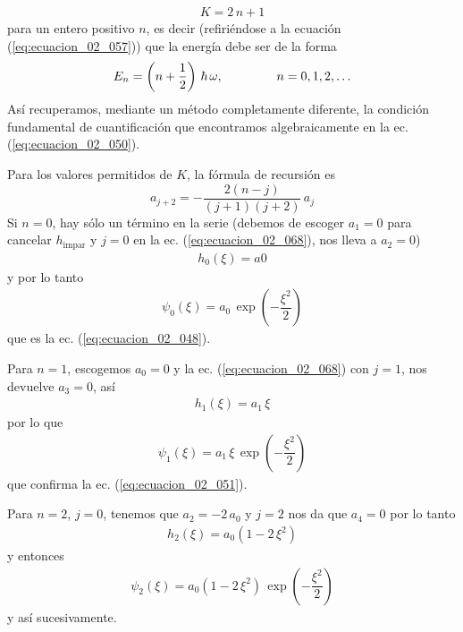 \begin{align*}
K = 2 \, n + 1
\end{align*}
para un entero positivo $n$, es decir (refiriéndose a la ecuación (\ref{eq:ecuacion_02_057})) que la energía debe ser de la forma
\begin{equation}
E_{n} = \left( n + \dfrac{1}{2} \right) \, \hbar \, \omega , \hspace{1.5cm} n = 0, 1, 2, \ldots
\label{eq:ecuacion_02_067}
\end{equation}
Así recuperamos, mediante un método completamente diferente, la condición fundamental de cuantificación que encontramos algebraicamente en la ec. (\ref{eq:ecuacion_02_050}).
\par
Para los valores permitidos de $K$, la fórmula de recursión es
\begin{equation}
a_{j+2} = - \dfrac{2 (n - j)}{(j + 1)(j + 2)} \, a_{j}
\label{eq:ecuacion_02_068}
\end{equation}
Si $n = 0$, hay sólo un término en la serie (debemos de escoger $a_{1} = 0$ para cancelar $h_{\text{impar}}$ y $j=0$ en la ec. (\ref{eq:ecuacion_02_068}), nos lleva a $a_{2}=0$)
\begin{align*}
h_{0} (\xi) = a{0}
\end{align*}
y por lo tanto
\begin{align*}
\psi_{0} (\xi) = a_{0} \, \exp \left( - \dfrac{\xi^{2}}{2} \right)
\end{align*}
que es la ec. (\ref{eq:ecuacion_02_048}).
\par
Para $n=1$, escogemos $a_{0} = 0$ y la ec. (\ref{eq:ecuacion_02_068}) con $j = 1$, nos devuelve $a_{3} = 0$, así
\begin{align*}
h_{1} (\xi) = a_{1} \, \xi
\end{align*}
por lo que
\begin{align*}
\psi_{1} (\xi) = a_{1} \, \xi \, \exp \left( - \dfrac{\xi^{2}}{2} \right)
\end{align*}
que confirma la ec. (\ref{eq:ecuacion_02_051}).
\par
Para $n = 2$, $j = 0$, tenemos que $a_{2} = - 2 \, a_{0}$ y $j = 2$ nos da que $a_{4} = 0$ por lo tanto
\begin{align*}
h_{2} (\xi) = a_{0} (1 - 2 \, \xi^{2})
\end{align*}
y entonces
\begin{align*}
\psi_{2} (\xi) = a_{0} (1 - 2 \, \xi^{2}) \, \exp \left( - \dfrac{\xi^{2}}{2} \right)
\end{align*}
y así sucesivamente.
\par
